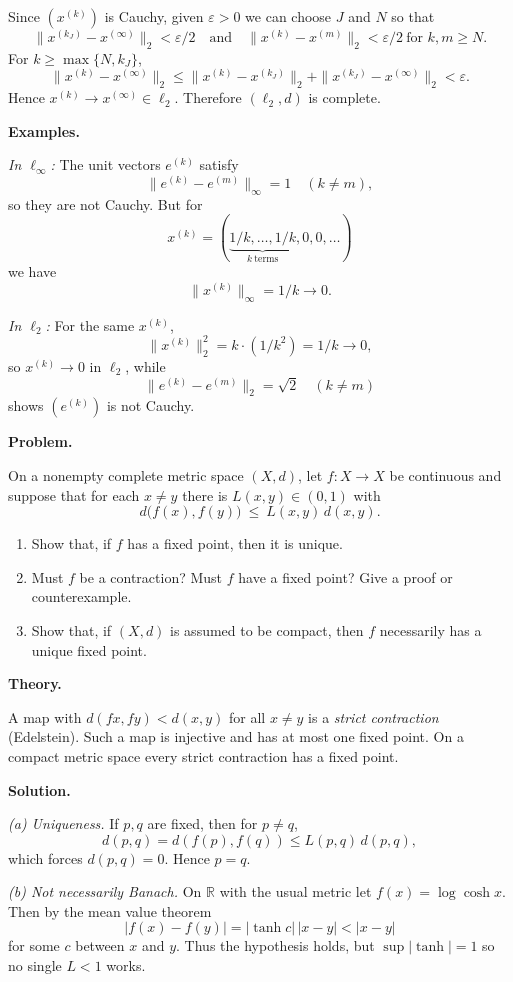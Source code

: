 \documentclass[12pt,a4paper]{article}
\begin{document}
Since $(x^{(k)})$ is Cauchy, given $\varepsilon>0$ we can choose
$J$ and $N$ so that
\[
\|x^{(k_J)}-x^{(\infty)}\|_2<\varepsilon/2
\quad\text{and}\quad
\|x^{(k)}-x^{(m)}\|_2<\varepsilon/2
\ \text{for }k,m\ge N.
\]
For $k\ge \max\{N,k_J\}$,
\[
\|x^{(k)}-x^{(\infty)}\|_2
\le \|x^{(k)}-x^{(k_J)}\|_2+\|x^{(k_J)}-x^{(\infty)}\|_2
<\varepsilon.
\]
Hence $x^{(k)}\to x^{(\infty)}\in\ell_2$.
Therefore $(\ell_2,d)$ is complete.

\medskip\medskip
\textbf{Examples.}

\emph{In $\ell_\infty$:}
The unit vectors $e^{(k)}$ satisfy
\[
\|e^{(k)}-e^{(m)}\|_\infty=1
\quad (k\ne m),
\]
so they are not Cauchy.
But for
\[
x^{(k)}=(\underbrace{1/k,\dots,1/k}_{k\ \text{terms}},0,0,\dots)
\]
we have
\[
\|x^{(k)}\|_\infty=1/k\to0.
\]

\medskip
\emph{In $\ell_2$:}
For the same $x^{(k)}$,
\[
\|x^{(k)}\|_2^2=k\cdot(1/k^2)=1/k\to0,
\]
so $x^{(k)}\to0$ in $\ell_2$,
while
\[
\|e^{(k)}-e^{(m)}\|_2=\sqrt2
\quad (k\ne m)
\]
shows $(e^{(k)})$ is not Cauchy.

	
\textbf{Problem.}

On a nonempty complete metric space $(X,d)$, let $f:X\to X$ be continuous and suppose that
for each $x\neq y$ there is $L(x,y)\in(0,1)$ with
\[
d\big(f(x),f(y)\big)\ \le\ L(x,y)\, d(x,y).
\]

\begin{enumerate}[label=(\alph*), leftmargin=2.4em, itemsep=0.6em, topsep=0.6em]
	\item Show that, if $f$ has a fixed point, then it is unique.
	\item Must $f$ be a contraction? Must $f$ have a fixed point?
	Give a proof or counterexample.
	\item Show that, if $(X,d)$ is assumed to be compact,
	then $f$ necessarily has a unique fixed point.
\end{enumerate}

\medskip\medskip
\textbf{Theory.}

A map with $d(fx,fy)<d(x,y)$ for all $x\neq y$ is a \emph{strict contraction} (Edelstein).
Such a map is injective and has at most one fixed point.
On a compact metric space every strict contraction has a fixed point.

\medskip\medskip
\textbf{Solution.}

\emph{(a) Uniqueness.}
If $p,q$ are fixed, then for $p\neq q$,
\[
d(p,q)=d(f(p),f(q))\le L(p,q)\,d(p,q),
\]
which forces $d(p,q)=0$. Hence $p=q$.

\medskip
\emph{(b) Not necessarily Banach.}
On $\mathbb R$ with the usual metric let $f(x)=\log\cosh x$.
Then by the mean value theorem
\[
|f(x)-f(y)|=|\tanh c|\,|x-y|<|x-y|
\]
for some $c$ between $x$ and $y$.
Thus the hypothesis holds, but $\sup|\tanh|=1$ so no single $L<1$ works.
\end{document}
